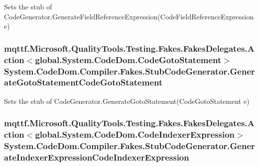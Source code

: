 Sets the stub of Code\-Generator.\-Generate\-Field\-Reference\-Expression(\-Code\-Field\-Reference\-Expression e)

\hypertarget{class_system_1_1_code_dom_1_1_compiler_1_1_fakes_1_1_stub_code_generator_af3372bdb2bc10fcd0ae1076cf26e9e7a}{
\subsubsection[{Generate\-Goto\-Statement\-Code\-Goto\-Statement}]{\setlength{\rightskip}{0pt plus 5cm}mqttf.\-Microsoft.\-Quality\-Tools.\-Testing.\-Fakes.\-Fakes\-Delegates.\-Action$<$global.\-System.\-Code\-Dom.\-Code\-Goto\-Statement$>$ System.\-Code\-Dom.\-Compiler.\-Fakes.\-Stub\-Code\-Generator.\-Generate\-Goto\-Statement\-Code\-Goto\-Statement}}\label{class_system_1_1_code_dom_1_1_compiler_1_1_fakes_1_1_stub_code_generator_af3372bdb2bc10fcd0ae1076cf26e9e7a}


Sets the stub of Code\-Generator.\-Generate\-Goto\-Statement(\-Code\-Goto\-Statement e)

\hypertarget{class_system_1_1_code_dom_1_1_compiler_1_1_fakes_1_1_stub_code_generator_a8708103c7a77312901bba80d3c82098f}{
\subsubsection[{Generate\-Indexer\-Expression\-Code\-Indexer\-Expression}]{\setlength{\rightskip}{0pt plus 5cm}mqttf.\-Microsoft.\-Quality\-Tools.\-Testing.\-Fakes.\-Fakes\-Delegates.\-Action$<$global.\-System.\-Code\-Dom.\-Code\-Indexer\-Expression$>$ System.\-Code\-Dom.\-Compiler.\-Fakes.\-Stub\-Code\-Generator.\-Generate\-Indexer\-Expression\-Code\-Indexer\-Expression}}\label{class_system_1_1_code_dom_1_1_compiler_1_1_fakes_1_1_stub_code_generator_a8708103c7a77312901bba80d3c82098f}



